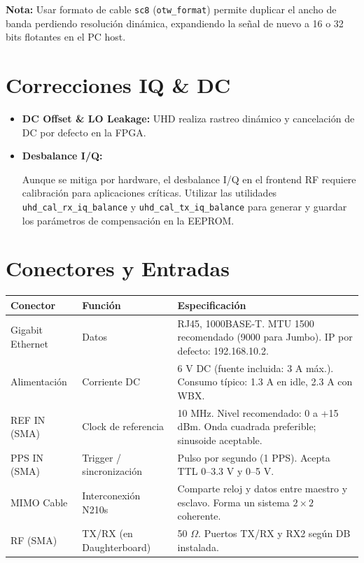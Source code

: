 \documentclass[11pt]{article}
\begin{document}
\textbf{Nota:} Usar formato de cable \texttt{sc8} (\texttt{otw\_format}) permite duplicar el ancho de banda perdiendo resolución dinámica, expandiendo la señal de nuevo a 16 o 32 bits flotantes en el PC host.

\section{Correcciones IQ \& DC}

\begin{itemize}
    \item \textbf{DC Offset \& LO Leakage:} UHD realiza rastreo dinámico y cancelación de DC por defecto en la FPGA.
    \item \textbf{Desbalance I/Q:}
    \begin{pendiente}
    Aunque se mitiga por hardware, el desbalance I/Q en el frontend RF requiere calibración para aplicaciones críticas. Utilizar las utilidades \texttt{uhd\_cal\_rx\_iq\_balance} y \texttt{uhd\_cal\_tx\_iq\_balance} para generar y guardar los parámetros de compensación en la EEPROM.
    \end{pendiente}
\end{itemize}

\section{Conectores y Entradas}

\begin{table}[h]
    \centering
    \small
    \begin{tabular}{p{}p{}p{}}
        \toprule
        \textbf{Conector} & \textbf{Función} & \textbf{Especificación} \\
        \midrule
        Gigabit Ethernet & Datos & RJ45, 1000BASE-T. MTU 1500 recomendado (9000 para Jumbo). IP por defecto: 192.168.10.2. \\
        Alimentación & Corriente DC & 6 V DC (fuente incluida: 3 A máx.). Consumo típico: 1.3 A en idle, 2.3 A con WBX. \\
        REF IN (SMA) & Clock de referencia & 10 MHz. Nivel recomendado: 0 a +15 dBm. Onda cuadrada preferible; sinusoide aceptable. \\
        PPS IN (SMA) & Trigger / sincronización & Pulso por segundo (1 PPS). Acepta TTL 0--3.3 V y 0--5 V. \\
        MIMO Cable & Interconexión N210s & Comparte reloj y datos entre maestro y esclavo. Forma un sistema $2\times2$ coherente. \\
        RF (SMA) & TX/RX (en Daughterboard) & 50 $\Omega$. Puertos TX/RX y RX2 según DB instalada. \\
        \bottomrule
    \end{tabular}
\end{table}
\end{document}
